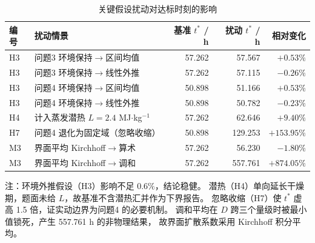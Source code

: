 \begin{table}[H]
  \centering
  \caption{关键假设扰动对达标时刻的影响}
  \label{tab:sensitivity}
  \small
  \begin{tabular}{llrrr}
    \toprule
    编号 & 扰动情景 & 基准 $t^*$ / h & 扰动 $t^*$ / h & 相对变化 \\
    \midrule
    H3 & 问题3 环境保持$\to$区间均值   & 57.262 & 57.567  & $+0.53\%$ \\
    H3 & 问题3 环境保持$\to$线性外推   & 57.262 & 57.115  & $-0.26\%$ \\
    H3 & 问题4 环境保持$\to$区间均值   & 50.898 & 51.166  & $+0.53\%$ \\
    H3 & 问题4 环境保持$\to$线性外推   & 50.898 & 50.782  & $-0.23\%$ \\
    H4 & 计入蒸发潜热 $L=2.4$ MJ$\cdot$kg$^{-1}$ & 57.262 & 62.646 & $+9.40\%$ \\
    H7 & 问题4 退化为固定域（忽略收缩） & 50.898 & 129.253 & $+153.95\%$ \\
    M3 & 界面平均 Kirchhoff$\to$算术    & 57.262 & 56.230  & $-1.80\%$ \\
    M3 & 界面平均 Kirchhoff$\to$调和    & 57.262 & 557.761 & $+874.05\%$ \\
    \bottomrule
  \end{tabular}

  \vspace{2pt}
  \parbox{0.94\linewidth}{\footnotesize
  注：环境外推假设（H3）影响不足 $0.6\%$，结论稳健。
  潜热（H4）单向延长干燥期，题面未给 $L$，故基准不含潜热汇并作为下界报告。
  忽略收缩（H7）使 $t^*$ 虚高 1.5 倍，证实动边界为问题4 的必要机制。
  调和平均在 $D$ 跨三个量级时被最小值锁死，产生 557.761 h 的非物理结果，
  故界面扩散系数采用 Kirchhoff 积分平均。}
\end{table}
